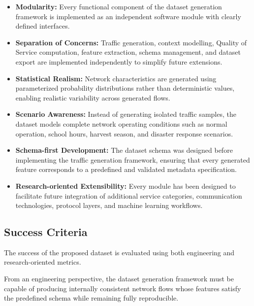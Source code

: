 \documentclass[12pt,a4paper]{article}
\begin{document}
\begin{itemize}
	
	\item \textbf{Modularity:} Every functional component of the dataset generation framework is implemented as an independent software module with clearly defined interfaces.
	
	\item \textbf{Separation of Concerns:} Traffic generation, context modelling, Quality of Service computation, feature extraction, schema management, and dataset export are implemented independently to simplify future extensions.
	
	\item \textbf{Statistical Realism:} Network characteristics are generated using parameterized probability distributions rather than deterministic values, enabling realistic variability across generated flows.
	
	\item \textbf{Scenario Awareness:} Instead of generating isolated traffic samples, the dataset models complete network operating conditions such as normal operation, school hours, harvest season, and disaster response scenarios.
	
	\item \textbf{Schema-first Development:} The dataset schema was designed before implementing the traffic generation framework, ensuring that every generated feature corresponds to a predefined and validated metadata specification.
	
	\item \textbf{Research-oriented Extensibility:} Every module has been designed to facilitate future integration of additional service categories, communication technologies, protocol layers, and machine learning workflows.
	
\end{itemize}

\subsection{Success Criteria}

The success of the proposed dataset is evaluated using both engineering and research-oriented metrics.

From an engineering perspective, the dataset generation framework must be capable of producing internally consistent network flows whose features satisfy the predefined schema while remaining fully reproducible.
\end{document}
